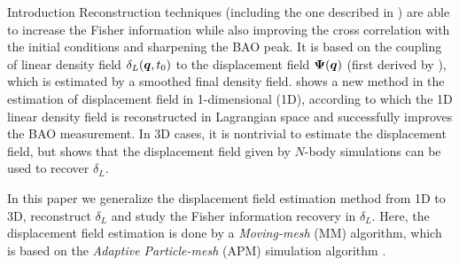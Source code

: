 \begin{section}{Introduction}
Reconstruction techniques (including the one described in 
\cite{bib:HarnoisD2013}) are able to increase the Fisher information
while also improving the cross correlation with the initial conditions
and sharpening the BAO peak. It is based on the coupling of linear
density field $\delta_L(\boldsymbol{q},t_0)$ to the displacement field
$\boldsymbol\Psi(\boldsymbol{q})$ (first derived by \cite{bib:Zel1970}), which
is estimated by a smoothed final density field.
\cite{bib:Zhu2016} shows a new method in the estimation of displacement
field in 1-dimensional (1D), according to which the 1D linear density
field is reconstructed in Lagrangian space and successfully improves 
the BAO measurement. In 3D cases, it is nontrivial to estimate
the displacement field, but \cite{bib:Yu2016} shows that the displacement
field given by $N$-body simulations can be used to recover $\delta_L$.

In this paper we generalize the displacement field estimation method
from 1D \citep{bib:Zhu2016} to 3D, reconstruct $\delta_L$ and study
the Fisher information recovery in $\delta_L$. Here, the displacement field
estimation is done by a \textit{Moving-mesh} (MM) algorithm, which is based on
the \textit{Adaptive Particle-mesh} (APM) simulation algorithm \citep{bib:Pen1995,bib:Pen1998}.






\end{section}
